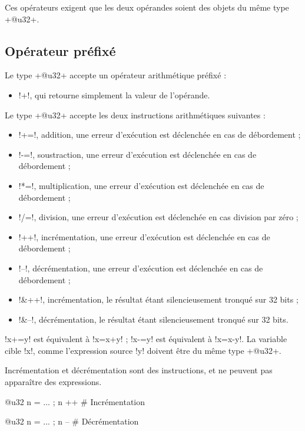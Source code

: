{Ces opérateurs exigent que les deux opérandes soient des objets du même type \ggsq+@u32+.

\subsection{Opérateur préfixé}
Le type \ggsq+@u32+ accepte un opérateur arithmétique préfixé :
\begin{itemize}
  \item \ggsq!+!, qui retourne simplement la valeur de l'opérande.
\end{itemize}


Le type \ggsq+@u32+ accepte les deux instructions arithmétiques suivantes :
\begin{itemize}
  \item \ggsq!+=!, addition, une erreur d'exécution est déclenchée en cas de débordement ;
  \item \ggsq!-=!, soustraction, une erreur d'exécution est déclenchée en cas de débordement ;
  \item \ggsq!*=!, multiplication, une erreur d'exécution est déclenchée en cas de débordement ;
  \item \ggsq!/=!, division, une erreur d'exécution est déclenchée en cas division par zéro ;
  \item \ggsq!++!, incrémentation, une erreur d'exécution est déclenchée en cas de débordement ;
  \item \ggsq!--!, décrémentation, une erreur d'exécution est déclenchée en cas de débordement ;
  \item \ggsq!&++!, incrémentation, le résultat étant silencieusement tronqué sur 32 bits ;
  \item \ggsq!&--!, décrémentation, le résultat étant silencieusement tronqué sur 32 bits.
\end{itemize}

\ggsq!x+=y! est équivalent à \ggsq!x=x+y! ; \ggsq!x-=y! est équivalent à \ggsq!x=x-y!.
La variable cible \ggsq!x!, comme l'expression source \ggsq!y! doivent être du même type \ggsq+@u32+.

Incrémentation et décrémentation sont des instructions, et ne peuvent pas apparaître des expressions.
\begin{galgas4}
@u32 n = ... ; n ++ # Incrémentation
\end{galgas4}

\begin{galgas4}
@u32 n = ... ; n -- # Décrémentation
\end{galgas4}




}
